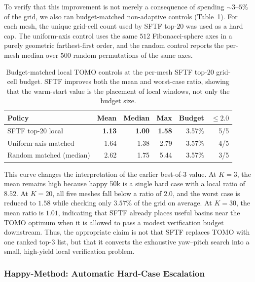 \documentclass[11pt,a4paper]{article}
\begin{document}
To verify that this improvement is not merely a consequence of spending $\sim$$3$--$5\%$ of the grid,
we also ran budget-matched non-adaptive controls (Table~\ref{tab:budget-matched-baseline}).
For each mesh, the unique grid-cell count used by SFTF top-$20$ was used as a hard cap.
The uniform-axis control uses the same $512$ Fibonacci-sphere axes in a purely geometric farthest-first order,
and the random control reports the per-mesh median over $500$ random permutations of the same axes.

\begin{table}[H]
\centering
\caption{Budget-matched local TOMO controls at the per-mesh SFTF top-$20$ grid-cell budget.
SFTF improves both the mean and worst-case ratio, showing that the warm-start value is the placement of local windows, not only the budget size.}
\label{tab:budget-matched-baseline}
\small
\begin{tabular}{lrrrrr}
\toprule
Policy & Mean & Median & Max & Budget & $\le 2.0$\\
\midrule
SFTF top-$20$ local & \textbf{1.13} & \textbf{1.00} & \textbf{1.58} & 3.57\% & 5/5\\
Uniform-axis matched & 1.64 & 1.38 & 2.79 & 3.57\% & 4/5\\
Random matched (median) & 2.62 & 1.75 & 5.44 & 3.57\% & 3/5\\
\bottomrule
\end{tabular}
\end{table}

This curve changes the interpretation of the earlier best-of-3 value.
At $K=3$, the mean remains high because happy 50k is a single hard case with a local ratio of $8.52$.
At $K=20$, all five meshes fall below a ratio of $2.0$, and the worst case is reduced to $1.58$ while checking only $3.57\%$ of the grid on average.
At $K=30$, the mean ratio is $1.01$, indicating that SFTF already places useful basins near the TOMO optimum when it is allowed to pass a modest verification budget downstream.
Thus, the appropriate claim is not that SFTF replaces TOMO with one ranked top-3 list,
but that it converts the exhaustive yaw--pitch search into a small, high-yield local verification problem.

\subsubsection{Happy-Method: Automatic Hard-Case Escalation}
\label{sec:happy-method}
\end{document}
